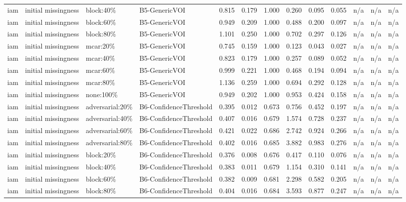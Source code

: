 \begin{table}[!ht]
{\begin{tabular}{lllllllllllll}
iam & initial missingness & block:40\% & B5-GenericVOI & 0.815 & 0.179 & 1.000 & 0.260 & 0.095 & 0.055 & n/a & n/a & n/a \\
iam & initial missingness & block:60\% & B5-GenericVOI & 0.949 & 0.209 & 1.000 & 0.488 & 0.200 & 0.097 & n/a & n/a & n/a \\
iam & initial missingness & block:80\% & B5-GenericVOI & 1.101 & 0.250 & 1.000 & 0.702 & 0.297 & 0.126 & n/a & n/a & n/a \\
iam & initial missingness & mcar:20\% & B5-GenericVOI & 0.745 & 0.159 & 1.000 & 0.123 & 0.043 & 0.027 & n/a & n/a & n/a \\
iam & initial missingness & mcar:40\% & B5-GenericVOI & 0.823 & 0.179 & 1.000 & 0.257 & 0.089 & 0.052 & n/a & n/a & n/a \\
iam & initial missingness & mcar:60\% & B5-GenericVOI & 0.999 & 0.221 & 1.000 & 0.468 & 0.194 & 0.094 & n/a & n/a & n/a \\
iam & initial missingness & mcar:80\% & B5-GenericVOI & 1.136 & 0.259 & 1.000 & 0.694 & 0.292 & 0.128 & n/a & n/a & n/a \\
iam & initial missingness & none:100\% & B5-GenericVOI & 0.949 & 0.202 & 1.000 & 0.953 & 0.424 & 0.158 & n/a & n/a & n/a \\
iam & initial missingness & adversarial:20\% & B6-ConfidenceThreshold & 0.395 & 0.012 & 0.673 & 0.756 & 0.452 & 0.197 & n/a & n/a & n/a \\
iam & initial missingness & adversarial:40\% & B6-ConfidenceThreshold & 0.407 & 0.016 & 0.679 & 1.574 & 0.728 & 0.237 & n/a & n/a & n/a \\
iam & initial missingness & adversarial:60\% & B6-ConfidenceThreshold & 0.421 & 0.022 & 0.686 & 2.742 & 0.924 & 0.266 & n/a & n/a & n/a \\
iam & initial missingness & adversarial:80\% & B6-ConfidenceThreshold & 0.402 & 0.016 & 0.685 & 3.882 & 0.983 & 0.276 & n/a & n/a & n/a \\
iam & initial missingness & block:20\% & B6-ConfidenceThreshold & 0.376 & 0.008 & 0.676 & 0.417 & 0.110 & 0.076 & n/a & n/a & n/a \\
iam & initial missingness & block:40\% & B6-ConfidenceThreshold & 0.383 & 0.011 & 0.679 & 1.154 & 0.310 & 0.141 & n/a & n/a & n/a \\
iam & initial missingness & block:60\% & B6-ConfidenceThreshold & 0.382 & 0.009 & 0.681 & 2.298 & 0.582 & 0.205 & n/a & n/a & n/a \\
iam & initial missingness & block:80\% & B6-ConfidenceThreshold & 0.404 & 0.016 & 0.684 & 3.593 & 0.877 & 0.247 & n/a & n/a & n/a \\

\end{tabular}}
\end{table}
